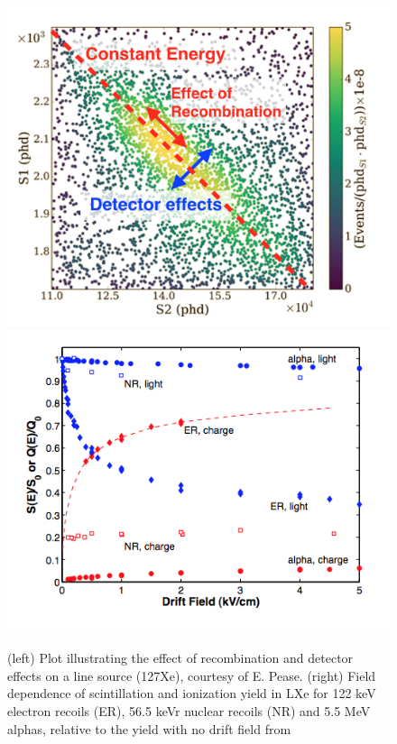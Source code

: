 \begin{figure}[htbp]
\begin{center}
\includegraphics[width=\halffig]{figures/lxetpcs/recombination.png}
\includegraphics[width=\halffig]{figures/lxetpcs/yields.png}
\caption{(left) Plot illustrating the effect of recombination and detector effects on a line source (127Xe), courtesy of E. Pease. (right) Field dependence of scintillation and ionization yield in LXe for 122 keV electron recoils (ER), 56.5 keVr nuclear recoils (NR) and 5.5 MeV alphas, relative to the yield with no drift field from \cite{Aprile2010}}
\label{fig:recombination}
\end{center}
\end{figure}

